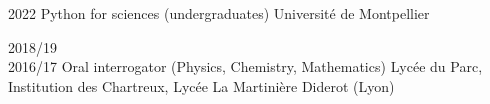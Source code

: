 \documentclass[letterpaper]{cvtemplate_en} %
\begin{document}
\begin{cvbody}

\cvitem
	{2022}
	{}
	{Python for sciences (undergraduates)}
	{Université de Montpellier }
	{}{}{}
	{}
	{}

\cvitem
	{2018/19\\ \mbox{}\hfill 2016/17}
	{}
	{Oral interrogator (Physics, Chemistry, Mathematics)}
	{Lyc\'ee du Parc, Institution des Chartreux, Lyc\'ee La Martinière Diderot (Lyon) }
	{}{}{}
	{}
	{
	}



\end{cvbody}
\end{document}
